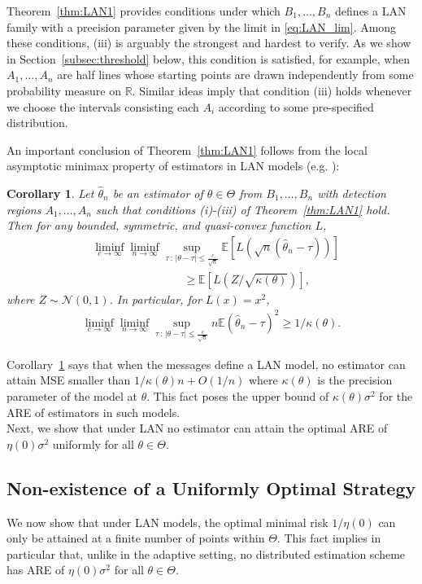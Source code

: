 \documentclass[letterpaper, 11pt]{IEEEtran}      %
\newtheorem{cor}[thm]{\bf {Corollary}}
\newcommand{\Ncal}{\mathcal{N}}
\begin{document}
Theorem~\ref{thm:LAN1} provides conditions under which $B_1,\ldots,B_n$ defines a LAN family with a precision parameter given by the limit in \eqref{eq:LAN_lim}. 
%
Among these conditions, (iii) is arguably the strongest and hardest to verify. As we show in Section~\ref{subsec:threshold} below, this condition is satisfied, for example, when $A_1, \ldots,A_n$ are half lines whose starting points are drawn independently from some probability measure on $\mathbb R$. Similar ideas imply that condition (iii) holds whenever we choose the intervals consisting each $A_i$ according to some pre-specified distribution. \par
%
An important conclusion of  Theorem~\ref{thm:LAN1} follows from the local asymptotic minimax property of estimators in LAN models (e.g. \cite{van2000asymptotic}):
\begin{cor} \label{cor:LA_minimax}
Let $\hat{\theta}_n$ be an estimator of $\theta \in \Theta$ from $B_1,\ldots,B_n$ with detection regions $A_1,\ldots,A_n$ such that conditions (i)-(iii) of Theorem~\ref{thm:LAN1} hold. Then for any bounded, symmetric, and quasi-convex function $L$, 
\begin{align*}
& \liminf_{c \to \infty} \liminf_{n \to \infty} \sup_{\tau\,:\,|\theta-\tau| \leq \frac{c}{\sqrt{n} }}  \mathbb E \left[ L\left( \sqrt{n}(\hat{\theta}_{n} - \tau) \right) \right]
\\
& \qquad \qquad \qquad \qquad \geq \mathbb E \left[ L (Z/\sqrt{\kappa(\theta)}) \right],
\end{align*}
where $Z \sim \Ncal(0,1)$. In particular, for $L(x) = x^2$, 
\begin{align*}
\liminf_{c \to \infty} \liminf_{n \to \infty} \sup_{\tau\,:\,|\theta-\tau| \leq \frac{c}{\sqrt{n} }}  n \mathbb E  \left( \hat{\theta}_{n} - \tau \right)^2 \geq 1/\kappa(\theta).
\end{align*}
\end{cor}
%
Corollary~\ref{cor:LA_minimax} says that when the messages define a LAN model, no estimator can attain MSE smaller than $1/\kappa(\theta)n + O(1/n)$ where $\kappa(\theta)$ is the precision parameter of the model at $\theta$. This fact poses the upper bound of $\kappa(\theta)\sigma^2$ for the ARE of estimators in such models. \\

Next, we show that under LAN no estimator can attain the optimal ARE of $\eta(0)\sigma^2$ uniformly for all $\theta \in \Theta$.

\subsection{Non-existence of a Uniformly Optimal Strategy}
We now show that under LAN models, the optimal minimal risk $1/\eta(0)$ can only be attained at a finite number of points within $\Theta$. This fact implies in particular that, unlike in the adaptive setting, no distributed estimation scheme has ARE of $\eta(0)\sigma^2$ for all $\theta \in \Theta$. 
\end{document}
